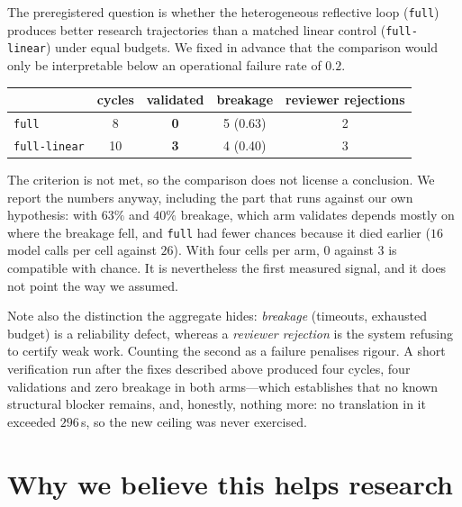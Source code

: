 \documentclass[11pt,a4paper]{article}
\newcommand{\code}[1]{\texttt{\small #1}}
\begin{document}
The preregistered question is whether the heterogeneous reflective loop
(\code{full}) produces better research trajectories than a matched linear
control (\code{full-linear}) under equal budgets. We fixed in advance that the
comparison would only be interpretable below an operational failure rate of
$0.2$.

\begin{center}
\small
\begin{tabular}{@{}lcccc@{}}
\toprule
& \textbf{cycles} & \textbf{validated} & \textbf{breakage} & \textbf{reviewer rejections} \\
\midrule
\code{full}         & 8  & \textbf{0} & 5 (0.63) & 2 \\
\code{full-linear}  & 10 & \textbf{3} & 4 (0.40) & 3 \\
\bottomrule
\end{tabular}
\end{center}

The criterion is not met, so the comparison does not license a conclusion. We
report the numbers anyway, including the part that runs against our own
hypothesis: with $63\%$ and $40\%$ breakage, which arm validates depends mostly
on where the breakage fell, and \code{full} had fewer chances because it died
earlier ($16$ model calls per cell against $26$). With four cells per arm, $0$
against $3$ is compatible with chance. It is nevertheless the first measured
signal, and it does not point the way we assumed.

Note also the distinction the aggregate hides: \emph{breakage} (timeouts,
exhausted budget) is a reliability defect, whereas a \emph{reviewer rejection}
is the system refusing to certify weak work. Counting the second as a failure
penalises rigour. A short verification run after the fixes described above
produced four cycles, four validations and zero breakage in both arms---which
establishes that no known structural blocker remains, and, honestly, nothing
more: no translation in it exceeded $296$\,s, so the new ceiling was never
exercised.

\section{Why we believe this helps research}
\end{document}
